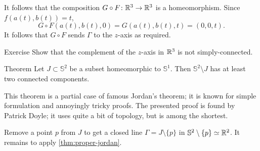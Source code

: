 It follows that the composition $G\circ F\colon\mathbb{R}^3\to\mathbb{R}^3$ is a homeomorphism.
Since $f(a(t),b(t))=t$,
\[G\circ F(a(t),b(t),0)=G(a(t),b(t),t)=(0,0,t).\]
It follows that $G\circ F$ sends $\Gamma$ to the $z$-axis as required.
\qeds

\begin{thm}{Exercise}\label{ex:z-axis}
Show that the complement of the $z$-axis in $\mathbb{R}^3$ is not simply-connected.
\end{thm}

\begin{thm}{Theorem}
Let $J\subset\mathbb{S}^2$ be a subset homeomorphic to $\mathbb{S}^1$.
Then $\mathbb{S}^2\setminus J$ has at least two connected components. 
\end{thm}

This theorem is a partial case of famous Jordan's theorem;
it is known for simple formulation and annoyingly tricky proofs.
The presented proof is found by Patrick Doyle; 
it uses quite a bit of topology, but is among the shortest.

Remove a point $p$ from $J$ to get a closed line $\Gamma=J\setminus\{p\}$ in $ \mathbb{S}^2\setminus\{p\}\simeq\mathbb{R}^2$.
It remains to apply \ref{thm:proper-jordan}.
\qeds

